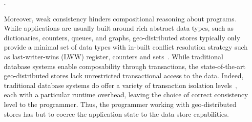 .

Moreover, weak consistency hinders compositional reasoning about programs.
While applications are usually built around rich abstract data types, such as
dictionaries, counters, queues, and graphs, geo-distributed stores typically
only provide a minimal set of data types with in-built conflict resolution
strategy such as last-writer-wins (LWW) register, counters and
sets~\cite{Cassandra,DynamoDB}.  While traditional database systems enable
composability through transactions, the state-of-the-art geo-distributed stores
lack unrestricted transactional access to the data. Indeed, traditional database
systems do offer a variety of transaction isolation levels~\cite{}, each with a
particular runtime overhead, leaving the choice of correct consistency level to
the programmer. Thus, the programmer working with geo-distributed stores has but
to coerce the application state to the data store capabilities.

